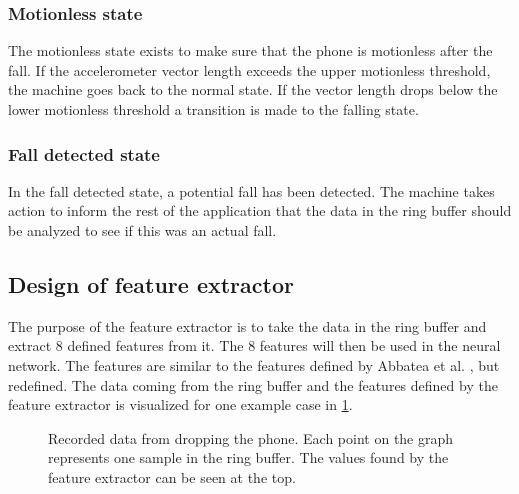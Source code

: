 \documentclass[12pt, a4paper, onecolumn]{article}
\begin{document}
	\subsubsection{Motionless state}
	
	The motionless state exists to make sure that the phone is motionless after the fall. If the accelerometer vector length exceeds the upper motionless threshold, the machine goes back to the normal state. If the vector length drops below the lower motionless threshold a transition is made to the falling state.
	
	\subsubsection{Fall detected state}
	
	In the fall detected state, a potential fall has been detected. The machine takes action to inform the rest of the application that the data in the ring buffer should be analyzed to see if this was an actual fall.
	
	\subsection{Design of feature extractor}
	
	The purpose of the feature extractor is to take the data in the ring buffer and extract 8 defined features from it. The 8 features will then be used in the neural network. The features are similar to the features defined by Abbatea et al. \cite{piza_uni}, but redefined. The data coming from the ring buffer and the features defined by the feature extractor is visualized for one example case in \ref{fig:fall-data-example}.
	
	\begin{figure}[H]
		\centering
		\caption{Recorded data from dropping the phone. Each point on the graph represents one sample in the ring buffer. The values found by the feature extractor can be seen at the top.}%
		\label{fig:fall-data-example}%
	\end{figure}
	
\end{document}
